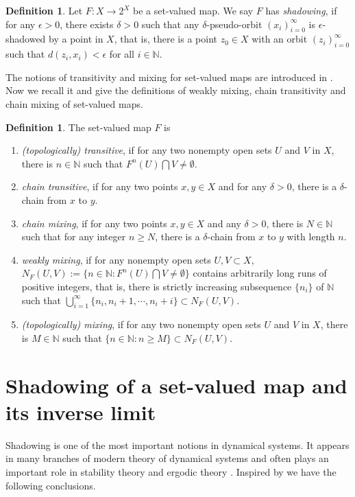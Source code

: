 \documentclass[12pt]{amsart}
\theoremstyle{definition}
\newtheorem{definition}[theorem]{Definition}
\begin{document}
\begin{definition}
	Let $F:X\rightarrow 2^X$ be a set-valued map. We say $F$ has \emph{shadowing}, if for any $\epsilon>0$, there exists $\delta>0$ such that any $\delta$-pseudo-orbit $(x_i)_{i=0}^\infty$ is $\epsilon$-shadowed by a point in $X$, that is, there is a point $z_0\in X$ with an orbit $(z_i)_{i=0}^\infty$ such that $d(z_i, x_i)<\epsilon$ for all $i\in\mathbb{N}$.
\end{definition}


The notions of transitivity and mixing for set-valued maps are introduced in \cite{kong}. Now we recall it and give the definitions of weakly mixing, chain transitivity and chain mixing {of} set-valued maps.


\begin{definition}
	The set-valued map $F$ is
	\begin{enumerate}
		\item \emph{(topologically) transitive}, if for any two nonempty open sets $U$ and $V$ in $X$, there is $n\in\mathbb{N}$ such that $F^n(U)\bigcap V\neq\emptyset$.
		
		\item \emph{chain transitive}, if for any two points $x,y\in X$ and for any $\delta>0$, there is a $\delta$-chain from $x$ to $y$.
		
		\item \emph{chain mixing}, if for any two points $x,y\in X$ and any $\delta>0$, there is $N\in\mathbb{N}$ such that for any integer $n\geq N$, there is a $\delta$-chain from $x$ to $y$ with length $n$.
		
		\item \emph{weakly mixing}, if for any nonempty open sets $U,V\subset X$, $N_F(U,V):=\{n\in\mathbb{N}:F^n(U)\bigcap V\neq\emptyset\}$ contains arbitrarily long runs of positive integers, that is, there is strictly increasing subsequence $\{n_i\}$ of $\mathbb{N}$ such that $\bigcup_{i=1}^\infty\{n_i,n_i+1,\cdots,n_i+i\}\subset N_F(U,V)$.
		
		\item \emph{(topologically) mixing}, if for any two nonempty open sets $U$ and $V$ in $X$, there is $M\in\mathbb{N}$ such that $\{n\in\mathbb{N}:n\geq M\}\subset N_F(U,V)$.
	\end{enumerate}
\end{definition}



\section{Shadowing of a set-valued map and its inverse limit}\label{secsha}
Shadowing is one of the most important notions in dynamical systems. %
It appears in many branches of modern theory of dynamical systems and often plays an important role in stability theory and ergodic theory \cite{20232}.
Inspired by \cite{Fakhari2010} we have the following conclusions.
\end{document}
